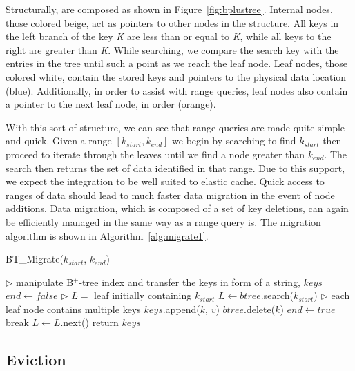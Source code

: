 Structurally, \bptrees are composed as shown in Figure~\ref{fig:bplustree}.
Internal nodes, those colored beige, act as pointers to other nodes in the
structure. All keys in the left branch of the key \emph{K} are less than or
equal to \emph{K}, while all keys to the right are greater than \emph{K}. While
searching, we compare the search key with the entries in the tree until such a
point as we reach the leaf node. Leaf nodes, those colored white, contain the
stored keys and pointers to the physical data location (blue). Additionally, in
order to assist with range queries, leaf nodes also contain a pointer to the
next leaf node, in order (orange).

With this sort of structure, we can see that range queries are made quite
simple and quick. Given a range $[k_{start}, k_{end}]$ we begin by searching to
find $k_{start}$ then proceed to iterate through the leaves until we find a
node greater than $k_{end}$. The search then returns the set of data identified
in that range. Due to this support, we expect the \bptree integration to be
well suited to elastic cache. Quick access to ranges of data should lead to
much faster data migration in the event of node additions. Data migration,
which is composed of a set of key deletions, can again be efficiently managed
in the same way as a range query is. The \bptree migration algorithm is shown
in Algorithm~\ref{alg:migrate1}.

\begin{algorithm}[htp]
\small
\caption{\label{alg:migrate1}BT\_Migrate($k_{start}$, $k_{end}$)} \begin{algorithmic}[1]
\STATE $\triangleright$ manipulate B$^+$-tree index and transfer the keys in form of a string, $keys$
\STATE $end \leftarrow false$
\STATE $\triangleright$ $L =$ leaf initially containing $k_{start}$ 
\STATE $L \leftarrow btree$.search($k_{start}$)
 \STATE $\triangleright$ each leaf node contains multiple keys
     \STATE $keys$.append($k$, $v$)
     \STATE $btree$.delete($k$)
   \ELSE
     \STATE $end \leftarrow true$
     \STATE break
   \ENDIF
 \ENDFOR
 \STATE $L \leftarrow L$.next()
\ENDWHILE
\STATE return $keys$
\end{algorithmic}
\end{algorithm}



\subsection{Eviction} %
\label{sub:cache_eviction}

